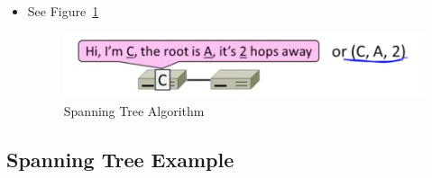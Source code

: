 \documentclass[12pt]{ctexart}   %
\begin{document}
\begin{itemize}
		\item See Figure~\ref{fig:3-8-5}
		
		\begin{figure}[h!] %
		\centering
		 \includegraphics[scale=0.7]{images/3-8-5}
		\caption{ Spanning Tree Algorithm }
		 \label{fig:3-8-5}
		 \end{figure}
	\end{itemize}
	
	\subsection{Spanning Tree Example}
\end{document}
